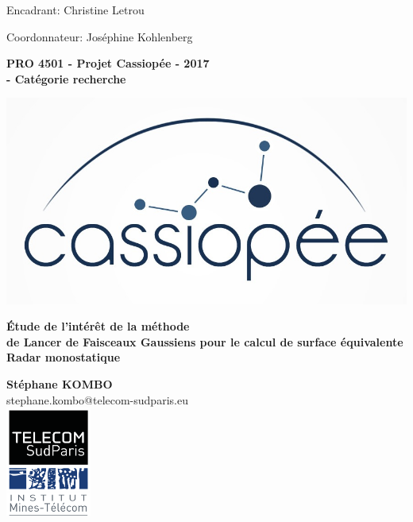 \vspace{2.5cm}
\begin{center}
{\Large Encadrant: Christine Letrou}
\end{center}
\vspace{0.5cm}
\begin{center}
{\Large Coordonnateur: Joséphine Kohlenberg}
\end{center}
\vspace{2.5cm}
\begin{center}
{\bf {\huge PRO 4501 - Projet Cassiopée - 2017}\\[25pt]{\Huge {} - Catégorie recherche}}
\vspace{0.5cm}

{\includegraphics{logoCassiopee.jpg}}
\end{center}
\vspace{0.5cm}
\begin{center}
{\bf {\Huge Étude de l'intérêt de la méthode\\ de Lancer de Faisceaux Gaussiens
pour le calcul de surface équivalente Radar monostatique}}%
\end{center}
\vspace{3.25cm}
\begin{center}
{\bf {\Large Stéphane KOMBO}}\\
{\large stephane.kombo@telecom-sudparis.eu}\\[10pt]
{\includegraphics[width=28mm]{logoTSP.png}}
\end{center}

\newpage